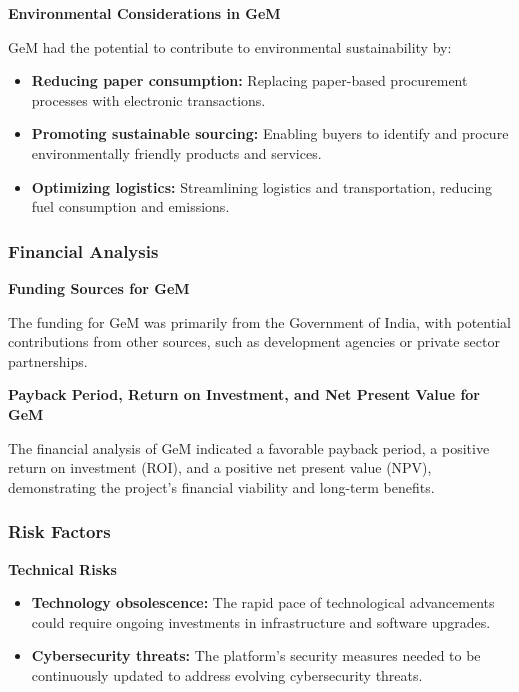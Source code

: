 \textbf{Environmental Considerations in GeM}

GeM had the potential to contribute to environmental sustainability by:

\begin{itemize}
    \item \textbf{Reducing paper consumption:} Replacing paper-based procurement processes with electronic transactions.
    \item \textbf{Promoting sustainable sourcing:} Enabling buyers to identify and procure environmentally friendly products and services.
    \item \textbf{Optimizing logistics:} Streamlining logistics and transportation, reducing fuel consumption and emissions.
\end{itemize}

\subsubsection{Financial Analysis}

\textbf{Funding Sources for GeM}

The funding for GeM was primarily from the Government of India, with potential contributions from other sources, such as development agencies or private sector partnerships.

\textbf{Payback Period, Return on Investment, and Net Present Value for GeM}

The financial analysis of GeM indicated a favorable payback period, a positive return on investment (ROI), and a positive net present value (NPV), demonstrating the project's financial viability and long-term benefits.

\subsubsection{Risk Factors}

\textbf{Technical Risks}

\begin{itemize}
    \item \textbf{Technology obsolescence:} The rapid pace of technological advancements could require ongoing investments in infrastructure and software upgrades.
    \item \textbf{Cybersecurity threats:} The platform's security measures needed to be continuously updated to address evolving cybersecurity threats.
\end{itemize}

